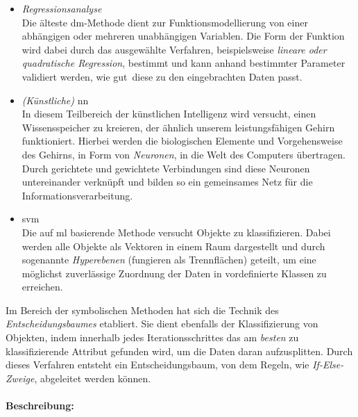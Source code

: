 \begin{itemize}
\item \textit{Regressionsanalyse}
\\ Die älteste \gls{dm}-Methode dient zur Funktionsmodellierung von einer abhängigen oder mehreren unabhängigen Variablen. Die Form der Funktion wird dabei durch das ausgewählte Verfahren, beispielsweise \textit{lineare oder quadratische Regression}, bestimmt und kann anhand bestimmter Parameter validiert werden, wie \glqq gut\grqq~diese zu den eingebrachten Daten passt.

\item \textit{(Künstliche)} \gls{nn}
\\ In diesem Teilbereich der künstlichen Intelligenz wird versucht, einen Wissensspeicher zu kreieren, der ähnlich unserem leistungsfähigen Gehirn funktioniert. Hierbei werden die biologischen Elemente und Vorgehensweise des Gehirns, in Form von \textit{Neuronen}, in die Welt des Computers übertragen. Durch gerichtete und gewichtete Verbindungen sind diese Neuronen untereinander verknüpft und bilden so ein gemeinsames Netz für die Informationsverarbeitung.

\item \gls{svm}
\\ Die auf \gls{ml} basierende Methode versucht Objekte zu klassifizieren. Dabei werden alle Objekte als Vektoren in einem Raum dargestellt und durch sogenannte \textit{Hyperebenen} (fungieren als Trennflächen) geteilt, um eine möglichst zuverlässige Zuordnung der Daten in vordefinierte Klassen zu erreichen.
\end{itemize}

Im Bereich der symbolischen Methoden hat sich die Technik des \textit{Entscheidungsbaumes} etabliert. Sie dient ebenfalls der Klassifizierung von Objekten, indem innerhalb jedes Iterationsschrittes das am \textit{besten} zu klassifizierende Attribut gefunden wird, um die Daten daran aufzusplitten. Durch dieses Verfahren entsteht ein Entscheidungsbaum, von dem Regeln, wie \textit{If-Else-Zweige}, abgeleitet werden können.

\paragraph{Beschreibung:}

